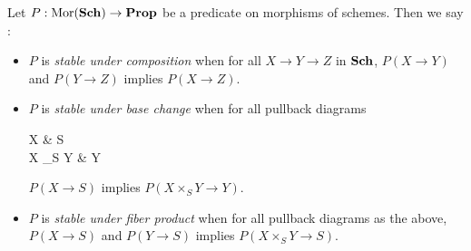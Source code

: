 \documentclass[../main.tex]{subfiles}
\begin{document}
\begin{dfn}[Permanence]
  
  Let $P : \operatorname{Mor}(\mathbf{Sch}) \to \mathbf{Prop}$ be a predicate on morphisms of schemes.
  Then we say :
  \begin{itemize}
    \item $P$ is \emph{stable under composition} when 
    for all $X \to Y \to Z$ in $\mathbf{Sch}$,
    $P(X \to Y)$ and $P(Y \to Z)$ implies $P(X \to Z)$.
    \item $P$ is \emph{stable under base change} when 
    for all pullback diagrams \begin{cd}
      X \ar[r] & S \\
      X \times_S Y \ar[r] \ar[u] & Y \ar[u]
    \end{cd}
    $P(X \to S)$ implies $P(X\times_S Y \to Y)$.
    \item $P$ is \emph{stable under fiber product} when 
    for all pullback diagrams as the above, 
    $P(X \to S)$ and $P(Y \to S)$ implies $P(X\times_S Y \to S)$.
  \end{itemize}
\end{dfn}
\end{document}
